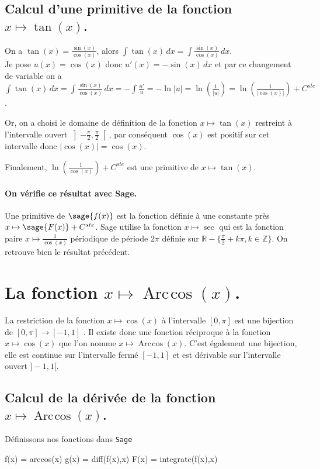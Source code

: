 \documentclass[a4paper,landscape,17pt]{extreport} %
\def\eclaire{\mathbb}
\def\R{\ensuremath{\eclaire R}}
\def\Z{\ensuremath{\eclaire Z}}
\renewcommand{\arccos}{\mathop{\mathrm{Arc\mspace{2mu}cos}}}
\begin{document}
\subsection{Calcul d'une primitive de la fonction  $x \mapsto \tan(x)$.}
On a $\tan(x)=\frac{\sin(x)}{\cos(x)}$, alors $\int \tan(x) \, dx =\int \frac{\sin(x)}{\cos(x)}\, dx$.\\
Je pose $u(x)=\cos(x)$ donc $u'(x)= -\sin(x) \,dx$ et par ce changement de variable on a $\int \tan(x) \, dx = \int \frac{\sin(x)}{\cos(x)}\, dx  = -\int \frac{u'}{u} = -\ln|u|  = \ln\left(\frac{1}{|u|}\right)  = \ln\left(\frac{1}{|\cos(x)|}\right) +C^{ste}$.

Or, on a choisi le domaine de définition de la fonction $x \mapsto \tan(x)$ restreint à l'intervalle ouvert $ \left] -\frac{\pi}{ 2} , \frac{\pi}{ 2} \right[ $, par conséquent $\cos(x)$ est positif sur cet intervalle donc $|\cos(x)| = \cos(x)$.

Finalement, $ \ln\left(\frac{1}{\cos(x)}\right) +C^{ste}$ est une primitive de $x \mapsto \tan(x)$.
\paragraph{On vérifie ce résultat avec Sage.}
Une primitive de $\sage{f(x)}$ est la fonction définie à une constante près $x \mapsto \sage{F(x)} + C^{ste} $.
Sage utilise la fonction $x\mapsto \sec$ qui est la fonction paire $x\mapsto \frac{1}{\cos(x)}$ périodique de période $2\pi$ définie sur $\R-\{ \frac{\pi}{2}+k\pi, k\in\Z\}$. On retrouve bien le résultat précédent.


\section{La fonction  $x \mapsto \arccos(x) $.}
La restriction de la fonction $x \mapsto \cos(x) $ à l'intervalle $[0,\pi]$ est une bijection de $[0,\pi] \rightarrow [-1,1]$ . Il existe donc une fonction réciproque à la fonction $x \mapsto \cos(x) $ que l'on nomme $x \mapsto \arccos(x) $. C'est également une bijection, elle est continue sur l'intervalle fermé  $ [-1,1]$ et est dérivable sur l'intervalle ouvert $]-1,1[$.

\subsection{Calcul de la dérivée de la fonction $x \mapsto \arccos(x) $.}
Définissons nos fonctions dans {\texttt{Sage}}
\begin{sageblock}
    f(x) = arccos(x)
    g(x) = diff(f(x),x)
    F(x) = integrate(f(x),x)
\end{sageblock}
\end{document}
